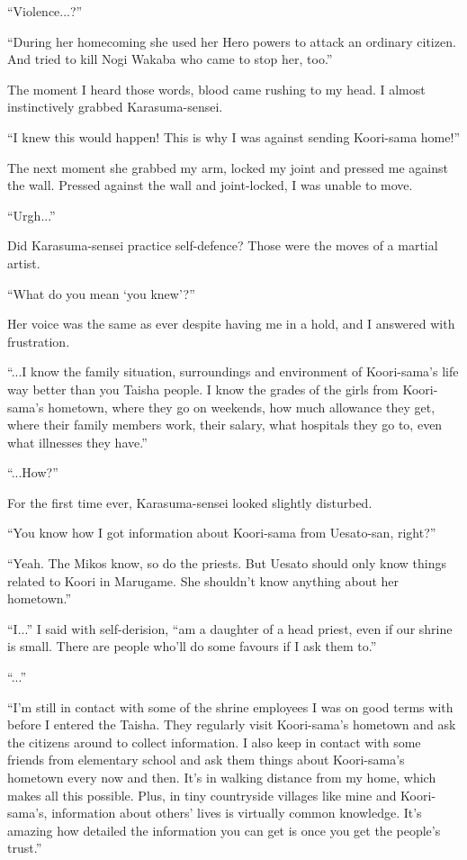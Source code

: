 ``Violence...?''

``During her homecoming she used her Hero powers to attack an ordinary citizen. And tried to kill Nogi Wakaba who came to stop her, too.''

The moment I heard those words, blood came rushing to my head. I almost instinctively grabbed Karasuma-sensei.

``I knew this would happen! This is why I was against sending Koori-sama home!''

The next moment she grabbed my arm, locked my joint and pressed me against the wall. Pressed against the wall and joint-locked, I was unable to move.

``Urgh...''

Did Karasuma-sensei practice self-defence? Those were the moves of a martial artist.

``What do you mean `you knew'?''

Her voice was the same as ever despite having me in a hold, and I answered with frustration.

``...I know the family situation, surroundings and environment of Koori-sama's life way better than you Taisha people. I know the grades of the girls from Koori-sama's hometown, where they go on weekends, how much allowance they get, where their family members work, their salary, what hospitals they go to, even what illnesses they have.''

``...How?''

For the first time ever, Karasuma-sensei looked slightly disturbed.

``You know how I got information about Koori-sama from Uesato-san, right?''

``Yeah. The Mikos know, so do the priests. But Uesato should only know things related to Koori in Marugame. She shouldn't know anything about her hometown.''

``I...'' I said with self-derision, ``am a daughter of a head priest, even if our shrine is small. There are people who'll do some favours if I ask them to.''

``...''

``I'm still in contact with some of the shrine employees I was on good terms with before I entered the Taisha. They regularly visit Koori-sama's hometown and ask the citizens around to collect information. I also keep in contact with some friends from elementary school and ask them things about Koori-sama's hometown every now and then. It's in walking distance from my home, which makes all this possible. Plus, in tiny countryside villages like mine and Koori-sama's, information about others' lives is virtually common knowledge. It's amazing how detailed the information you can get is once you get the people's trust.''

